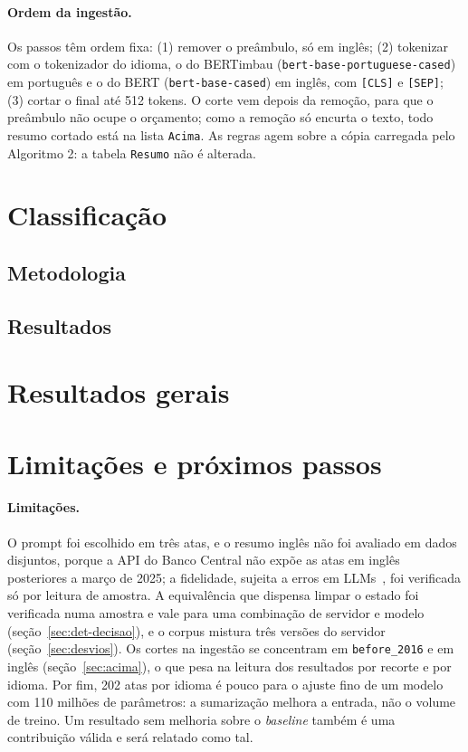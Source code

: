 \documentclass[12pt]{article}
\begin{document}
\paragraph{Ordem da ingestão.} Os passos têm ordem fixa: (1) remover o
preâmbulo, só em inglês; (2) tokenizar com o tokenizador do idioma, o do
BERTimbau (\texttt{bert-base-portuguese-cased}) em português e o do BERT
(\texttt{bert-base-cased}) em inglês, com \texttt{[CLS]} e \texttt{[SEP]}; (3)
cortar o final até 512 tokens. O corte vem depois da remoção, para que o
preâmbulo não ocupe o orçamento; como a remoção só encurta o texto, todo resumo
cortado está na lista \texttt{Acima}. As regras agem sobre a cópia carregada
pelo Algoritmo 2: a tabela \texttt{Resumo} não é alterada.

\section{Classificação}\label{sec:classificacao}

\subsection{Metodologia}\label{sec:alg2}

\subsection{Resultados}\label{sec:res-alg2}

\section{Resultados gerais}\label{sec:resultados-gerais}

\section{Limitações e próximos passos}\label{sec:limitacoes}

\paragraph{Limitações.} O prompt foi escolhido em três atas, e o resumo inglês
não foi avaliado em dados disjuntos, porque a API do Banco Central não expõe as
atas em inglês posteriores a março de 2025; a fidelidade, sujeita a erros em
LLMs~\cite{kim2024}, foi verificada só por leitura de amostra. A equivalência
que dispensa limpar o estado foi verificada numa amostra e vale para uma
combinação de servidor e modelo (seção~\ref{sec:det-decisao}), e o corpus
mistura três versões do servidor (seção~\ref{sec:desvios}). Os cortes na
ingestão se concentram em \texttt{before\_2016} e em inglês
(seção~\ref{sec:acima}), o que pesa na leitura dos resultados por recorte e por
idioma. Por fim, 202 atas por idioma é pouco para o ajuste fino de um modelo com
110 milhões de parâmetros: a sumarização melhora a entrada, não o volume de
treino. Um resultado sem melhoria sobre o \textit{baseline} também é uma
contribuição válida e será relatado como tal.
\end{document}
